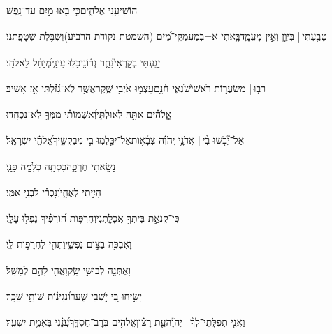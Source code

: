 \documentclass[12pt]{article}
\newcommand{\loc}[1]{\textsuperscript{\locf{#1}}}
\begin{document}
{\loc{ ב}~}‏הוֹשִׁיעֵ֥נִי אֱלֹהִ֑ים{\hfill}כִּ֤י בָ֖אוּ מַ֣יִם עַד־נָֽפֶשׁ׃\par

{\loc{ ג}~}‏טָבַ֤עְתִּי |  בִּיוֵ֣ן  וְאֵ֣ין מָעֳמָ֑ד{\hfill}בָּ֥אתִי א=בְמַעֲמַקֵּי־מַ֝יִם (השמטת נקודת הרביע){\hfill}וְשִׁבֹּ֥לֶת שְׁטָפָֽתְנִי׃\par

{\loc{ ד}~}‏יָגַ֣עְתִּי בְקׇרְאִי֮{\hfill}נִחַ֢ר גְּר֫וֹנִ֥י\newline\hspace*{.5em}כָּל֥וּ עֵינַ֑י{\hfill}מְ֝יַחֵ֗ל לֵאלֹהָֽי׃\par

{\loc{ ה}~}‏רַבּ֤וּ |  מִשַּׂעֲר֣וֹת רֹאשִׁי֮{\hfill}שֹׂנְאַ֢י חִ֫נָּ֥ם\newline\hspace*{.5em}עָצְמ֣וּ  אֹיְבַ֣י שֶׁ֑קֶר{\hfill}אֲשֶׁ֥ר לֹֽא־גָ֝זַ֗לְתִּי אָ֣ז אָשִֽׁיב׃\par

{\loc{ ו}~}‏אֱֽלֹהִ֗ים אַתָּ֣ה  לְאִוַּלְתִּ֑י{\hfill}וְ֝אַשְׁמוֹתַ֗י מִמְּךָ֥ לֹֽא־נִכְחָֽדוּ׃\par

{\loc{ ז}~}‏אַל־יֵ֘בֹ֤שׁוּ בִ֨י |  {\hfill}אֲדֹנָ֥י יֱהֹוִ֗ה צְבָ֫א֥וֹת\newline\hspace*{.5em}אַל־יִכָּ֣לְמֽוּ בִ֣י מְבַקְשֶׁ֑יךָ{\hfill}אֱ֝לֹהֵ֗י יִשְׂרָאֵֽל׃\par

{\loc{ ח}~}‏ נָשָׂ֣אתִי חֶרְפָּ֑ה{\hfill}כִּסְּתָ֖ה כְלִמָּ֣ה פָנָֽי׃\par

{\loc{ ט}~}‏ הָיִ֣יתִי לְאֶחָ֑י{\hfill}וְ֝נׇכְרִ֗י לִבְנֵ֥י אִמִּֽי׃\par

{\loc{ י}~}‏כִּֽי־קִנְאַ֣ת בֵּיתְךָ֣ אֲכָלָ֑תְנִי{\hfill}וְחֶרְפּ֥וֹת ח֝וֹרְפֶ֗יךָ נָפְל֥וּ עָלָֽי׃\par

{\loc{ יא}~}‏וָאֶבְכֶּ֣ה בַצּ֣וֹם נַפְשִׁ֑י{\hfill}וַתְּהִ֖י לַחֲרָפ֣וֹת לִֽי׃\par

{\loc{ יב}~}‏וָאֶתְּנָ֣ה לְבוּשִׁ֣י שָׂ֑ק{\hfill}וָאֱהִ֖י לָהֶ֣ם לְמָשָֽׁל׃\par

{\loc{ יג}~}‏יָשִׂ֣יחוּ בִ֭י יֹ֣שְׁבֵי שָׁ֑עַר{\hfill}וּ֝נְגִינ֗וֹת שׁוֹתֵ֥י שֵׁכָֽר׃\par

{\loc{ יד}~}‏וַאֲנִ֤י תְפִלָּֽתִי־לְךָ֨ |  יְהֹוָ֡ה{\hfill}עֵ֤ת רָצ֗וֹן\newline\hspace*{.5em}אֱלֹהִ֥ים בְּרׇב־חַסְדֶּ֑ךָ{\hfill}עֲ֝נֵ֗נִי בֶּאֱמֶ֥ת יִשְׁעֶֽךָ׃\par
\end{document}

